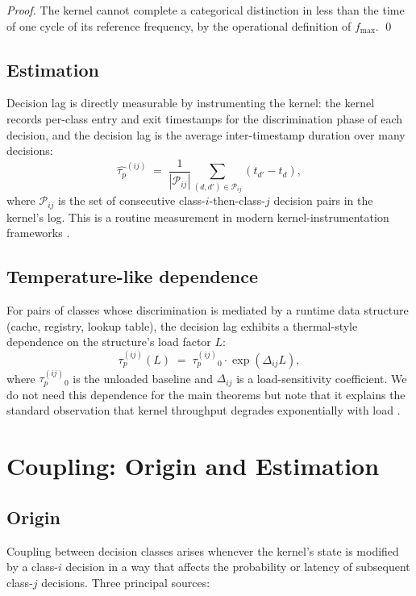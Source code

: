 \documentclass[twocolumn,11pt,a4paper]{article}
\newcommand{\taup}{\tau_p}
\begin{document}
\begin{proof}
The kernel cannot complete a categorical distinction in less than the time of one cycle of its reference frequency, by the operational definition of $f_\mathrm{max}$. \qed
\end{proof}

\subsection{Estimation}

Decision lag is directly measurable by instrumenting the kernel: the kernel records per-class entry and exit timestamps for the discrimination phase of each decision, and the decision lag is the average inter-timestamp duration over many decisions:
\[
\hat{\taup}^{(ij)} \;=\; \frac{1}{|\mathcal{P}_{ij}|}\sum_{(d, d') \in \mathcal{P}_{ij}} (t_{d'} - t_d),
\]
where $\mathcal{P}_{ij}$ is the set of consecutive class-$i$-then-class-$j$ decision pairs in the kernel's log. This is a routine measurement in modern kernel-instrumentation frameworks \citep{cantrill2004dynamic, gregg2013systems}.

\subsection{Temperature-like dependence}

For pairs of classes whose discrimination is mediated by a runtime data structure (cache, registry, lookup table), the decision lag exhibits a thermal-style dependence on the structure's load factor $L$:
\[
\taup^{(ij)}(L) \;=\; \taup^{(ij)}_0 \cdot \exp(\Delta_{ij} L),
\]
where $\taup^{(ij)}_0$ is the unloaded baseline and $\Delta_{ij}$ is a load-sensitivity coefficient. We do not need this dependence for the main theorems but note that it explains the standard observation that kernel throughput degrades exponentially with load \citep{ousterhout1990why,jain1991art}.

\section{Coupling: Origin and Estimation}
\label{sec:coupling}

\subsection{Origin}

Coupling between decision classes arises whenever the kernel's state is modified by a class-$i$ decision in a way that affects the probability or latency of subsequent class-$j$ decisions. Three principal sources:
\end{document}
